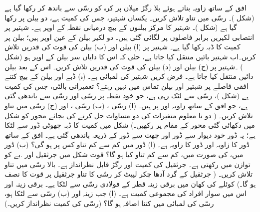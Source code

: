 افق کے ساتھ  زاویہ بناتے ہوئے بلا رگڑ  میلان  پر   کرہ  کو رسّی سے باندھ کر رکھا گیا ہے (شکل )۔ رسّی میں تناو تلاش کریں۔
یکساں شہتیر، جس کی کمیت  ہے، دو  بیلن پر رکھا گیا ہے (شکل )۔  شہتیر کا مرکز بیلنوں کے بیچ  درمیانی نقطہ کے اوپر  ہے۔ شہتیر پر  انتصابی لکیریں برابر فاصلوں   پر لگائی گئی ہیں۔ دو لکیر  بیلن کے  عین اوپر ہیں؛ بیلن  پر   کمیت کا ڈبہ رکھا گیا ہے۔ شہتیر پر (ا) بیلن  اور (ب) بیلن   کی قوت کی قدریں تلاش کریں۔اب  شہتیر  بائیں منتقل کیا جاتا ہے، حتٰی کہ  اس کا دایاں سر بیلن  کے اوپر ہو (شکل ) ۔شہتیر پر  (ج) بیلن  اور (د) بیلن   کی قوت کی قدریں تلاش کریں۔ اس کے بعد بیلن دائیں منتقل کیا جاتا ہے۔ فرض کریں شہتیر کی لمبائی  ہے۔ (ہ)  ڈبے اور  بیلن  کے بیچ کتنے افقی فاصلے پر شہتیر اور بیلن  تماس میں نہیں رہتے؟
تعمیراتی   بالٹی، جس کی کمیت  ہے (شکل )، رسّی  سے لٹک رہی ہے، جو خود نقطہ  پر رسّی  اور رسّی   سے باندھی گئی ہے، جو افق کے ساتھ زاویہ  اور  پر ہیں۔ (ا) رسّی ، (ب) رسّی ، اور (ج) رسّی  میں تناو تلاش کریں۔ ( دو  نا معلوم متغیرات کی  دو مساوات حل کرنے کی بجائے محور   کو شکل میں دکھائی گئی محور  کے مقام پر   رکھیں۔)
شکل  میں کمیت  کا  ڈبہ  چھوٹی ڈور سے لٹکا ہے؛ یہ  ڈور خود دیوار سے ڈور  اور چھت سے ڈور  کے ذریعہ باندھی  گئی ہے۔  افق کے ساتھ ڈور  کا زاویہ  اور ڈور  کا زاویہ   ہے۔ (ا)  ڈور  میں کم سے کم تناو کس  پر ہو گی؟  (ب)  ڈور  میں،  کی صورت میں، کم سے کم تناو کیا ہو گا؟
قوت  شکل  میں جرثقیل  اور  .بے کو توازن میں رکھتی ہے۔ جرثقیل کی کمیت  اور رگڑ قابل نظرانداز ہے۔ بالا رسّی میں تناو  تلاش کریں۔ ( جرثقیل کے گرد آدھا چکر لپیٹ کر رسّی کا تناو جرثقیل پر قوت کا نصف ہو گا۔)
کوئلے کی کھان میں برقی  زینہ   قطر  کے فولادی رسّی سے لٹکا ہے۔ برقی زینہ  اور  اس میں سوار افراد کی مجموعی  کمیت  ہے۔ (ا) جب زینہ  اور (ب)  رسّی سے لٹکا ہو، رسّی  کی لمبائی میں کتنا  اضافہ ہو گا؟ (رسّی کی کمیت نظرانداز کریں۔)
